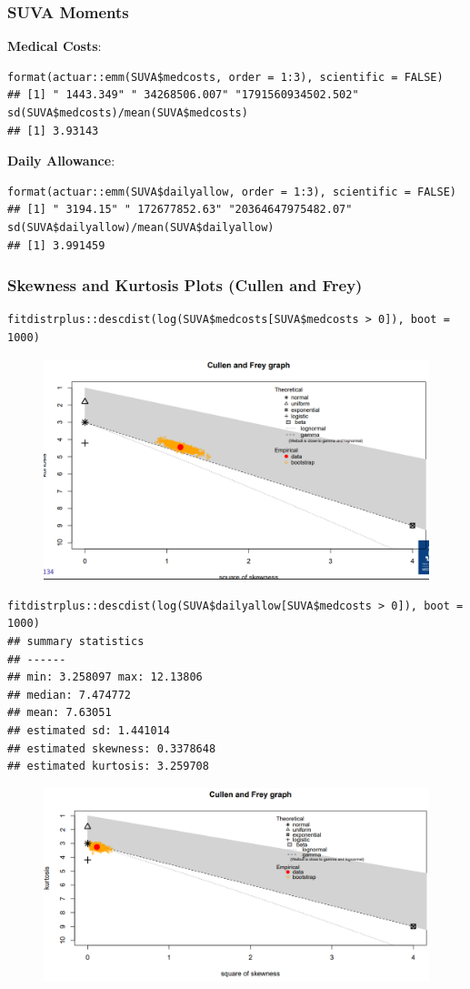 \documentclass[11pt]{article}
\newcommand{\noi}{\noindent}
\begin{document}
\subsubsection{SUVA Moments}
\noi \textbf{Medical Costs}:
\begin{lstlisting}
format(actuar::emm(SUVA$medcosts, order = 1:3), scientific = FALSE)
## [1] " 1443.349" " 34268506.007" "1791560934502.502"
sd(SUVA$medcosts)/mean(SUVA$medcosts)
## [1] 3.93143
\end{lstlisting}

\noi \textbf{Daily Allowance}:
\begin{lstlisting}
format(actuar::emm(SUVA$dailyallow, order = 1:3), scientific = FALSE)
## [1] " 3194.15" " 172677852.63" "20364647975482.07"
sd(SUVA$dailyallow)/mean(SUVA$dailyallow)
## [1] 3.991459
\end{lstlisting}

\subsubsection{Skewness and Kurtosis Plots (Cullen and Frey)}
\begin{lstlisting}
fitdistrplus::descdist(log(SUVA$medcosts[SUVA$medcosts > 0]), boot = 1000)
\end{lstlisting}
\begin{figure}[H]
    \centering
    \includegraphics[width=0.7\linewidth]{SUVA data - Cullen and Frey - MedCosts.png}
\end{figure}

\begin{lstlisting}
fitdistrplus::descdist(log(SUVA$dailyallow[SUVA$medcosts > 0]), boot = 1000)
## summary statistics
## ------
## min: 3.258097 max: 12.13806
## median: 7.474772
## mean: 7.63051
## estimated sd: 1.441014
## estimated skewness: 0.3378648
## estimated kurtosis: 3.259708
\end{lstlisting}
\begin{figure}[H]
    \centering
    \includegraphics[width=0.7\linewidth]{SUVA data - Cullen and Frey - Daily Allow.png}
\end{figure}
\end{document}
